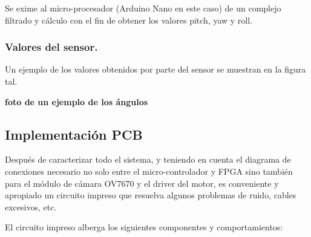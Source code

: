 Se exime al micro-procesador (Arduino Nano en este caso) de un complejo filtrado y cálculo con el fin de obtener los valores pitch, yaw y roll. 

\subsubsection{Valores del sensor. }

Un ejemplo de los valores obtenidos por parte del sensor se muestran en la figura tal.

\textbf{foto de un ejemplo de los ángulos}
 


\subsection{Implementación PCB}

Después de caracterizar todo el sistema, y teniendo en cuenta el diagrama de conexiones necesario no solo entre el micro-controlador y FPGA sino también para el módulo de cámara OV7670 y el driver del motor, es conveniente y apropiado un circuito impreso que resuelva algunos problemas de ruido, cables excesivos, etc. \newline

El circuito impreso alberga los siguientes componentes y
comportamientos:

